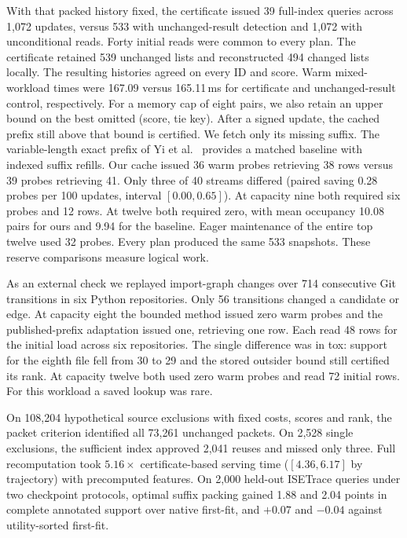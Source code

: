 \documentclass[conference]{IEEEtran}
\begin{document}
With that packed history fixed, the certificate issued 39 full-index queries across 1,072 updates, versus 533 with unchanged-result detection and 1,072 with unconditional reads. Forty initial reads were common to every plan. The certificate retained 539 unchanged lists and reconstructed 494 changed lists locally. The resulting histories agreed on every ID and score. Warm mixed-workload times were 167.09 versus 165.11\,ms for certificate and unchanged-result control, respectively. For a memory cap of eight pairs, we also retain an upper bound on the best omitted (score, tie key). After a signed update, the cached prefix still above that bound is certified. We fetch only its missing suffix. The variable-length exact prefix of Yi et al.~\cite{topk} provides a matched baseline with indexed suffix refills. Our cache issued 36 warm probes retrieving 38 rows versus 39 probes retrieving 41. Only three of 40 streams differed (paired saving 0.28 probes per 100 updates, interval $[0.00,0.65]$). At capacity nine both required six probes and 12 rows. At twelve both required zero, with mean occupancy 10.08 pairs for ours and 9.94 for the baseline. Eager maintenance of the entire top twelve used 32 probes. Every plan produced the same 533 snapshots. These reserve comparisons measure logical work.

As an external check we replayed import-graph changes over 714 consecutive Git transitions in six Python repositories. Only 56 transitions changed a candidate or edge. At capacity eight the bounded method issued zero warm probes and the published-prefix adaptation issued one, retrieving one row. Each read 48 rows for the initial load across six repositories. The single difference was in tox: support for the eighth file fell from 30 to 29 and the stored outsider bound still certified its rank. At capacity twelve both used zero warm probes and read 72 initial rows. For this workload a saved lookup was rare.

On 108,204 hypothetical source exclusions with fixed costs, scores and rank, the packet criterion identified all 73,261 unchanged packets. On 2,528 single exclusions, the sufficient index approved 2,041 reuses and missed only three. Full recomputation took $5.16\times$ certificate-based serving time ($[4.36,6.17]$ by trajectory) with precomputed features. On 2,000 held-out ISETrace queries under two checkpoint protocols, optimal suffix packing gained 1.88 and 2.04 points in complete annotated support over native first-fit, and $+0.07$ and $-0.04$ against utility-sorted first-fit.
\end{document}
